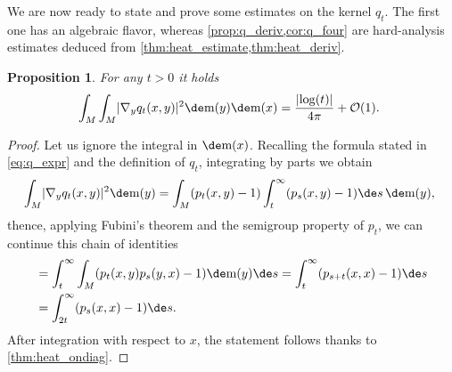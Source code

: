 \documentclass[10pt]{amsart}
\theoremstyle{plain}
\newtheorem{proposition}[proposition]{Proposition}
\theoremstyle{definition}
\numberwithin{equation}{section}
\newcommand{\bigo}{\ensuremath{\mathcal{O}}}
\renewcommand{\comma}{\ensuremath{\text{, }}}
\newcommand{\comma}{\ensuremath{\text{, }}}
\newcommand{\fullstop}{\ensuremath{\text{. }}}
\newcommand{\m}{\ensuremath{\mathrm m}}
\DeclarePairedDelimiter\abs{\lvert}{\rvert}
\begin{document}
We are now ready to state and prove some estimates on the kernel $q_t$.
The first one has an algebraic flavor, whereas \cref{prop:q_deriv,cor:q_four} are
hard-analysis estimates deduced from \cref{thm:heat_estimate,thm:heat_deriv}.

\begin{proposition}\label{prop:on_diag_int}
For any $t>0$ it holds
\begin{equation*}
\int_M\int_M \abs{\nabla_y q_t(x,y)}^2\de\m(y)\de\m(x)
= \frac{\abs{\log(t)}}{4\pi} + \bigo(1)\fullstop
\end{equation*}
\end{proposition}
\begin{proof}
Let us ignore the integral in $\de\m(x)$.
Recalling the formula stated in \cref{eq:q_expr} and the definition of $q_t$, integrating by parts we obtain
\begin{equation*}
\int_M \abs{\nabla_y q_t(x,y)}^2\de\m(y)
= \int_M (p_t(x,y)-1)\int_t^{\infty}(p_s(x,y)-1)\de s\,\de\m(y) \comma
\end{equation*}
thence, applying Fubini's theorem and the semigroup property of $p_t$, we can continue this
chain of identities
\begin{align*}
&=\int_t^{\infty}\int_M (p_t(x,y)p_s(y, x)-1)\de\m(y)\de s
=\int_t^{\infty}(p_{s+t}(x,x)-1)\de s \\
&=\int_{2t}^{\infty}(p_s(x,x)-1)\de s \fullstop
\end{align*}
After integration with respect to $x$, the statement follows thanks to \cref{thm:heat_ondiag}.
\end{proof}
\end{document}
